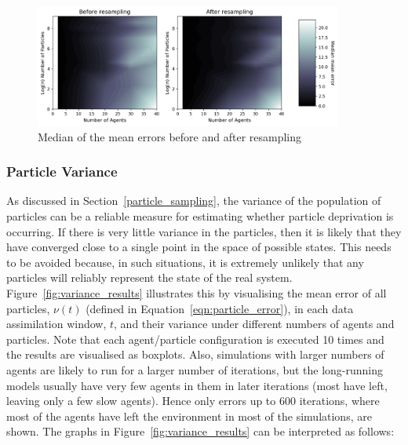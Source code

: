 \begin{figure}[ht]
	\centering
	\includegraphics[width=0.9\textwidth]{figures/results/resampling}
	\caption{Median of the mean errors before and after resampling}\label{fig:resampling}
\end{figure}

\subsubsection{Particle Variance}

As discussed in Section~\ref{particle_sampling}, the variance of the population of particles can be a reliable measure for estimating whether particle deprivation is occurring. If there is very little variance in the particles, then it is likely that they have converged close to a single point in the space of possible states. This needs to be avoided because, in such situations, it is extremely unlikely that any particles will reliably represent the state of the real system. Figure~\ref{fig:variance_results} illustrates this by visualising the mean error of all particles, $\nu(t)$ (defined in Equation~\ref{eqn:particle_error}), in each data assimilation window, $t$, and their variance under different numbers of agents and particles. Note that each agent/particle configuration is executed 10 times and the results are visualised as boxplots. Also, simulations with larger numbers of agents are likely to run for a larger number of iterations, but the long-running models usually have very few agents in them in later iterations (most have left, leaving only a few slow agents). Hence only errors up to 600 iterations, where most of the agents have left the environment in most of the simulations, are shown. The graphs in Figure~\ref{fig:variance_results} can be interpreted as follows: 

